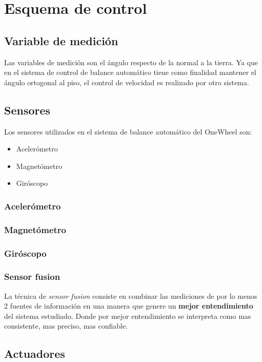 
\section{Esquema de control}
\subsection{Variable de medici\'on}
Las variables de medición son el ángulo respecto de la normal a la tierra. Ya que en el sistema de control de balance automático tiene como finalidad mantener el ángulo ortogonal al piso, el control de velocidad es realizado por otro sistema.
  
\subsection{Sensores}
Los sensores utilizados en el sistema de balance automático del OneWheel son:
\begin{itemize}
\item Aceler\'ometro
\item Magnetómetro
\item Giróscopo
\end{itemize}
\subsubsection{Aceler\'ometro}
\subsubsection{Magnetómetro}
\subsubsection{Giróscopo}
\subsubsection{Sensor fusion}
La t\'ecnica de \textit{sensor fusion} consiste en combinar las mediciones de por lo menos 2 fuentes de informaci\'on en una manera que genere un \textbf{mejor entendimiento} del sistema estudiado. Donde por mejor entendimiento se interpreta como mas consistente, mas preciso, mas confiable.

\subsection{Actuadores}
